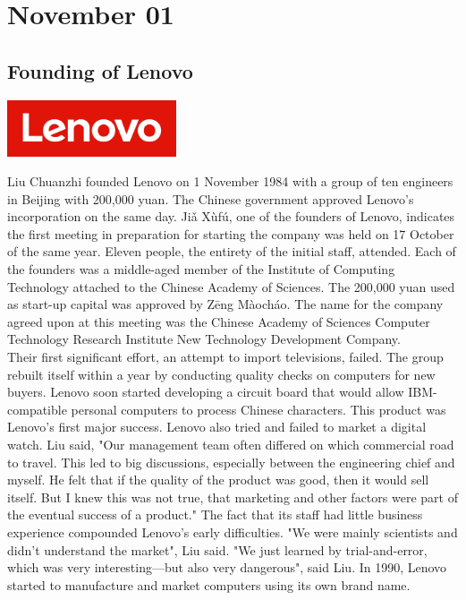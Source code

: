 \documentclass[11pt]{report}
\begin{document}
\section{November 01}
\subsection{Founding of Lenovo}
\vspace{2mm}\begin{center}\includegraphics[width=5cm]{./img/lenovoLogo.jpg}\end{center}
Liu Chuanzhi founded Lenovo on 1 November 1984 with a group of ten engineers in Beijing with 200,000 yuan. The Chinese government approved Lenovo's incorporation on the same day. Jiǎ Xùfú, one of the founders of Lenovo, indicates the first meeting in preparation for starting the company was held on 17 October of the same year. Eleven people, the entirety of the initial staff, attended. Each of the founders was a middle-aged member of the Institute of Computing Technology attached to the Chinese Academy of Sciences. The 200,000 yuan used as start-up capital was approved by Zēng Màocháo. The name for the company agreed upon at this meeting was the Chinese Academy of Sciences Computer Technology Research Institute New Technology Development Company.\\
\indent Their first significant effort, an attempt to import televisions, failed. The group rebuilt itself within a year by conducting quality checks on computers for new buyers. Lenovo soon started developing a circuit board that would allow IBM-compatible personal computers to process Chinese characters. This product was Lenovo's first major success. Lenovo also tried and failed to market a digital watch. Liu said, "Our management team often differed on which commercial road to travel. This led to big discussions, especially between the engineering chief and myself. He felt that if the quality of the product was good, then it would sell itself. But I knew this was not true, that marketing and other factors were part of the eventual success of a product." The fact that its staff had little business experience compounded Lenovo's early difficulties. "We were mainly scientists and didn't understand the market", Liu said. "We just learned by trial-and-error, which was very interesting—but also very dangerous", said Liu. In 1990, Lenovo started to manufacture and market computers using its own brand name.
\end{document}

